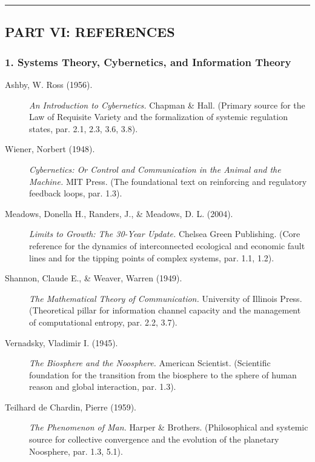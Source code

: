 \documentclass[11pt,a4paper,oneside]{article} %
\begin{document}
\begin{center}\rule{0.5\linewidth}{0.5pt}\end{center}

\newpage
\hypertarget{part-vi-references}{%
\subsection{PART VI: REFERENCES}\label{part-vi-references}}

\hypertarget{systems-theory-cybernetics-and-information-theory}{%
\subsubsection*{1. Systems Theory, Cybernetics, and Information Theory}\label{systems-theory-cybernetics-and-information-theory}}

\begin{description}
\item[Ashby, W. Ross (1956).] \emph{An Introduction to Cybernetics.} Chapman \& Hall. (Primary source for the Law of Requisite Variety and the formalization of systemic regulation states, par. 2.1, 2.3, 3.6, 3.8).

\item[Wiener, Norbert (1948).] \emph{Cybernetics: Or Control and Communication in the Animal and the Machine.} MIT Press. (The foundational text on reinforcing and regulatory feedback loops, par. 1.3).

\item[Meadows, Donella H., Randers, J., \& Meadows, D. L. (2004).] \emph{Limits to Growth: The 30-Year Update.} Chelsea Green Publishing. (Core reference for the dynamics of interconnected ecological and economic fault lines and for the tipping points of complex systems, par. 1.1, 1.2).

\item[Shannon, Claude E., \& Weaver, Warren (1949).] \emph{The Mathematical Theory of Communication.} University of Illinois Press. (Theoretical pillar for information channel capacity and the management of computational entropy, par. 2.2, 3.7).

\item[Vernadsky, Vladimir I. (1945).] \emph{The Biosphere and the Noosphere.} American Scientist. (Scientific foundation for the transition from the biosphere to the sphere of human reason and global interaction, par. 1.3).

\item[Teilhard de Chardin, Pierre (1959).] \emph{The Phenomenon of Man.} Harper \& Brothers. (Philosophical and systemic source for collective convergence and the evolution of the planetary Noosphere, par. 1.3, 5.1).
\end{description}
\end{document}
